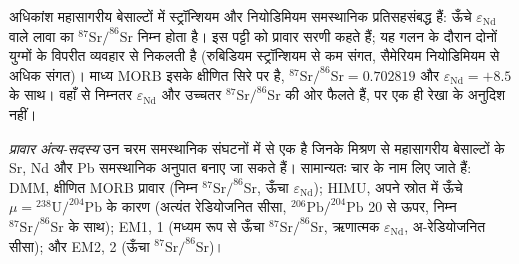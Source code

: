 अधिकांश महासागरीय बेसाल्टों में स्ट्रॉन्शियम और नियोडिमियम समस्थानिक प्रतिसहसंबद्ध हैं:
ऊँचे $\varepsilon_{\mathrm{Nd}}$ वाले लावा का
$^{87}\mathrm{Sr}/^{86}\mathrm{Sr}$ निम्न होता है। इस पट्टी को प्रावार सरणी कहते हैं; यह
गलन के दौरान दोनों युग्मों के विपरीत व्यवहार से निकलती है (रुबिडियम स्ट्रॉन्शियम से कम
संगत, सैमेरियम नियोडिमियम से अधिक संगत)। माध्य
MORB इसके क्षीणित सिरे पर है, $^{87}\mathrm{Sr}/^{86}\mathrm{Sr} = 0.702819$ और
$\varepsilon_{\mathrm{Nd}} = +8.5$ के साथ।  वहाँ से
निम्नतर $\varepsilon_{\mathrm{Nd}}$ और उच्चतर $^{87}\mathrm{Sr}/^{86}\mathrm{Sr}$ की ओर फैलते हैं, पर
एक ही रेखा के अनुदिश नहीं।

\begin{definition}[प्रावार अंत्य-सदस्य]\label{def:b2:isotope-geochemistry:end-members}
\emph{प्रावार अंत्य-सदस्य} उन चरम
समस्थानिक संघटनों में से एक है जिनके मिश्रण से महासागरीय
बेसाल्टों के Sr, Nd और Pb समस्थानिक अनुपात बनाए जा सकते हैं। सामान्यतः चार के नाम लिए जाते हैं: DMM, क्षीणित
MORB प्रावार (निम्न $^{87}\mathrm{Sr}/^{86}\mathrm{Sr}$, ऊँचा $\varepsilon_{\mathrm{Nd}}$);
HIMU, अपने स्रोत में ऊँचे $\mu = {}^{238}\mathrm{U}/^{204}\mathrm{Pb}$ के कारण
(अत्यंत रेडियोजनित सीसा, $^{206}\mathrm{Pb}/^{204}\mathrm{Pb}$ 20 से ऊपर, निम्न
$^{87}\mathrm{Sr}/^{86}\mathrm{Sr}$ के साथ); EM1,  1 (मध्यम रूप से ऊँचा
$^{87}\mathrm{Sr}/^{86}\mathrm{Sr}$, ऋणात्मक $\varepsilon_{\mathrm{Nd}}$, अ-रेडियोजनित
सीसा); और EM2,  2 (ऊँचा $^{87}\mathrm{Sr}/^{86}\mathrm{Sr}$)।
\end{definition}

